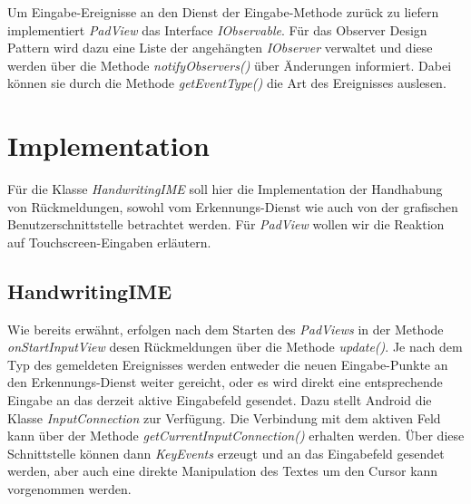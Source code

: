 Um Eingabe-Ereignisse an den Dienst der Eingabe-Methode zurück zu liefern implementiert \emph{PadView} das Interface \emph{IObservable}. Für das Observer Design Pattern wird dazu eine Liste der angehängten \emph{IObserver} verwaltet und diese werden über die Methode \emph{notifyObservers()} über Änderungen informiert. Dabei können sie durch die Methode \emph{getEventType()} die Art des Ereignisses auslesen.

\section{Implementation}

Für die Klasse \emph{HandwritingIME} soll hier die Implementation der Handhabung von Rückmeldungen, sowohl vom Erkennungs-Dienst wie auch von der grafischen Benutzerschnittstelle betrachtet werden. Für \emph{PadView} wollen wir die Reaktion auf Touchscreen-Eingaben erläutern.

\subsection{HandwritingIME}

Wie bereits erwähnt, erfolgen nach dem Starten des \emph{PadViews} in der Methode \emph{onStartInputView} desen Rückmeldungen über die Methode \emph{update()}. Je nach dem Typ des gemeldeten Ereignisses werden entweder die neuen Eingabe-Punkte an den Erkennungs-Dienst weiter gereicht, oder es wird direkt eine entsprechende Eingabe an das derzeit aktive Eingabefeld gesendet. Dazu stellt Android die Klasse \emph{InputConnection} zur Verfügung. Die Verbindung mit dem aktiven Feld kann über der Methode \emph{getCurrentInputConnection()} erhalten werden. Über diese Schnittstelle können dann \emph{KeyEvents} erzeugt und an das Eingabefeld gesendet werden, aber auch eine direkte Manipulation des Textes um den Cursor kann vorgenommen werden.


